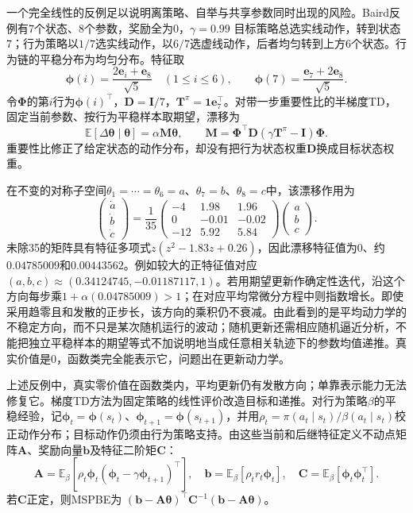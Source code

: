 一个完全线性的反例足以说明离策略、自举与共享参数同时出现的风险。Baird反例有7个状态、8个参数，奖励全为0，$\gamma=0.99$
目标策略总选实线动作，转到状态7；行为策略以$1/7$选实线动作，以$6/7$选虚线动作，后者均匀转到上方6个状态。行为链的平稳分布为均匀分布。特征取
\[
  \bm{\phi}(i)=\frac{2\bm{e}_i+\bm{e}_8}{\sqrt5}\quad(1\leq i\leq6),
  \qquad
  \bm{\phi}(7)=\frac{\bm{e}_7+2\bm{e}_8}{\sqrt5}.
\]
令$\bm{\Phi}$的第$i$行为$\bm{\phi}(i)^\top$，$\bm{D}=\bm{I}/7$，$\bm{T}^\pi=\bm{1}\bm{e}_7^\top$。对带一步重要性比的半梯度TD，固定当前参数、按行为平稳样本取期望，漂移为
\begin{equation}
  \mathbb E[\Delta\bm{\theta}\mid\bm{\theta}]
     =\alpha\bm{M}\bm{\theta},\qquad
  \bm{M}=\bm{\Phi}^\top\bm{D}
                   (\gamma\bm{T}^\pi-\bm{I})\bm{\Phi}.
  \label{eq:rl-learning-baird-matrix}
\end{equation}
重要性比修正了给定状态的动作分布，却没有把行为状态权重$\bm{D}$换成目标状态权重。

在不变的对称子空间$\theta_1=\cdots=\theta_6=a$、$\theta_7=b$、$\theta_8=c$中，该漂移作用为
\begin{equation}
  \begin{pmatrix}\dot a\\\dot b\\\dot c\end{pmatrix}
  =
  \frac1{35}
  \begin{pmatrix}
    -4 & 1.98 & 1.96\\
     0 & -0.01 & -0.02\\
    -12 & 5.92 & 5.84
  \end{pmatrix}
  \begin{pmatrix}a\\b\\c\end{pmatrix}.
  \label{eq:rl-learning-baird-reduced}
\end{equation}
未除35的矩阵具有特征多项式$z(z^2-1.83z+0.26)$，因此漂移特征值为$0$、约$0.04785009$和$0.00443562$。例如较大的正特征值对应$(a,b,c)\approx(0.34124745,-0.01187117,1)$。若用期望更新作确定性迭代，沿这个方向每步乘$1+\alpha(0.04785009)>1$；在对应平均常微分方程中则指数增长。即使采用趋零且和发散的正步长，该方向的乘积仍不衰减。由此看到的是平均动力学的不稳定方向，而不只是某次随机运行的波动；随机更新还需相应随机逼近分析，不能把独立平稳样本的期望等式不加说明地当成任意相关轨迹下的参数均值递推。真实价值是0，函数类完全能表示它，问题出在更新动力学。

上述反例中，真实零价值在函数类内，平均更新仍有发散方向；单靠表示能力无法修复它。梯度TD方法为固定策略的线性评价改造目标和递推。对行为策略$\beta$的平稳经验，记$\bm\phi_t=\bm\phi(s_t)$、$\bm\phi_{t+1}=\bm\phi(s_{t+1})$，并用$\rho_t=\pi(a_t\mid s_t)/\beta(a_t\mid s_t)$校正动作分布；目标动作仍须由行为策略支持。由这些当前和后继特征定义不动点矩阵$\bm A$、奖励向量$\bm b$及特征二阶矩$\bm C$：
\[
  \bm{A}=\mathbb E_\beta[\rho_t\bm{\phi}_t
          (\bm{\phi}_t-\gamma\bm{\phi}_{t+1})^\top],\quad
  \bm{b}=\mathbb E_\beta[\rho_t r_t\bm{\phi}_t],\quad
  \bm{C}=\mathbb E_\beta[\bm{\phi}_t\bm{\phi}_t^\top].
\]
若$\bm C$正定，则MSPBE为
$(\bm b-\bm A\bm\theta)^\top\bm C^{-1}
 (\bm b-\bm A\bm\theta)$。

